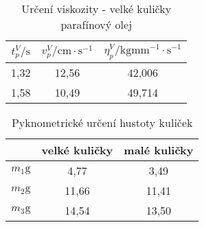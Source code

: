 \documentclass[a4paper,12pt]{article}
\begin{document}
 \begin{table}[!htb]
	\label{viskozitap-velke kulicky}
     \caption[]{Určení viskozity - velké kuličky parafínový olej} 
   \begin{center}
    \begin{tabular}{|c|c|c|}
        \hline
        $t_{p}^V/\mathrm{s}$	& $v_{p}^V/\mathrm{cm\cdot s^{-1}}$	&	$\eta_{p}^{V}/\mathrm{kgmm^{-1}\cdot s^{-1}}$ \\
\hline		\hline		 
  1,32 &	12,56	&42,006\\
  \hline
1,58 &	10,49&	49,714\\
\hline
      \end{tabular}
     \end{center}
  \end{table}  
   \begin{table}[!htb]
	\label{pyknokul}
     \caption[]{Pyknometrické určení hustoty kuliček} 
   \begin{center}
    \begin{tabular}{|c||c|c|}
\hline   
 &velké kuličky & malé kuličky\\
 \hline \hline
 $m_1 \mathrm{g}$ & 4,77 & 3,49 \\
 \hline
  $m_2 \mathrm{g}$ & 11,66& 11,41 \\
   \hline
   $m_3 \mathrm{g}$ & 14,54&13,50 \\
    \hline
    \end{tabular}  
         \end{center}
  \end{table} 
\end{document}
